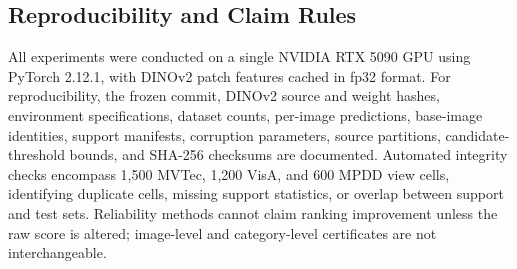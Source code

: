 \subsection{Reproducibility and Claim Rules}
All experiments were conducted on a single NVIDIA RTX 5090 GPU using PyTorch 2.12.1, with DINOv2 patch features cached in fp32 format. For reproducibility, the frozen commit, DINOv2 source and weight hashes, environment specifications, dataset counts, per-image predictions, base-image identities, support manifests, corruption parameters, source partitions, candidate-threshold bounds, and SHA-256 checksums are documented. Automated integrity checks encompass 1,500 MVTec, 1,200 VisA, and 600 MPDD view cells, identifying duplicate cells, missing support statistics, or overlap between support and test sets. Reliability methods cannot claim ranking improvement unless the raw score is altered; image-level and category-level certificates are not interchangeable.
